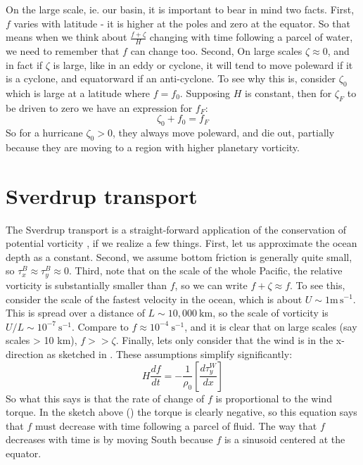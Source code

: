 On the large scale, ie. our basin, it is important to bear in mind two facts.  First, $f$ varies with latitude - it is higher at the poles and zero at the equator. So that means when we think about $\frac{f+\zeta}{H}$ changing with time following a parcel of water, we need to remember that $f$ can change too.  Second, On large scales $\zeta \approx 0$, and in fact if $\zeta$ is large, like in an eddy or cyclone, it will tend to move poleward if it is a cyclone, and equatorward if an anti-cyclone.  To see why this is, consider $\zeta_0$ which is large at a latitude where $f=f_0$.  Supposing $H$ is constant, then for $\zeta_F$ to be driven to zero we have an expression for $f_F$:
\begin{equation}
    \zeta_0 + f_0 = f_F
\end{equation}
So for a hurricane $\zeta_0>0$, they always move poleward, and die out, partially because they are moving to a region with higher planetary vorticity.

\section{Sverdrup transport}  

The Sverdrup transport is a straight-forward application of the conservation of potential vorticity , if we realize a few things.  First, let us approximate the ocean depth as a constant.  Second, we assume bottom friction is generally quite small, so $\tau_x^B\approx\tau_y^B\approx 0$. Third, note that on the scale of the whole Pacific, the relative vorticity is substantially smaller than $f$, so we can write $f+\zeta \approx f$.  To see this, consider the scale of the fastest velocity in the ocean, which is about $U\sim 1 \mathrm{m\,s^{-1}}$.  This is spread over a distance of $L\sim 10,000\ \mathrm{km}$, so the scale of vorticity is $U/L \sim 10^{-7}\ \mathrm{s^{-1}}$.  Compare to $f\approx 10^{-4}\ \mathrm{s^{-1}}$, and it is clear that on large scales (say scales > 10 km), $f>>\zeta$.  Finally, lets only consider that the wind is in the x-direction as sketched in .
These assumptions simplify  significantly:
\begin{equation}
    H\frac{d f}{dt} = -\frac{1}{\rho_0}\left[\frac{d\tau_y^W}{dx}\right]
\end{equation}   
So what this says is that the rate of change of $f$ is proportional to the wind torque.  In the sketch above () the torque is clearly negative, so this equation says that $f$ must decrease with time following a parcel of fluid.  The way that $f$ decreases with time is by moving South because $f$ is a sinusoid centered at the equator. 

